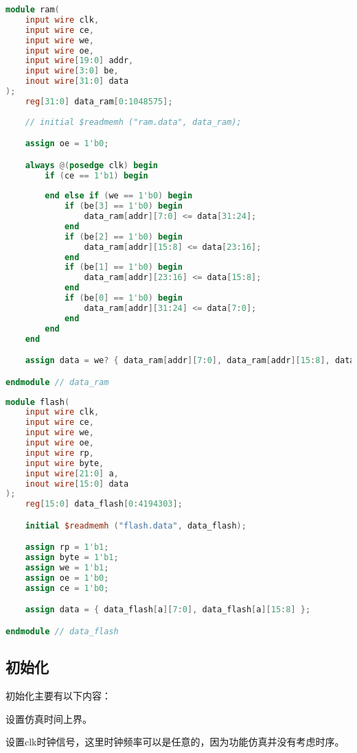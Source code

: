 \begin{lstlisting}[language=verilog]
module ram(
    input wire clk,
    input wire ce,
    input wire we,
    input wire oe,
    input wire[19:0] addr,
    input wire[3:0] be,
    inout wire[31:0] data
);
    reg[31:0] data_ram[0:1048575];
    
    // initial $readmemh ("ram.data", data_ram);

    assign oe = 1'b0;

    always @(posedge clk) begin
        if (ce == 1'b1) begin
            
        end else if (we == 1'b0) begin
            if (be[3] == 1'b0) begin
                data_ram[addr][7:0] <= data[31:24]; 
            end
            if (be[2] == 1'b0) begin
                data_ram[addr][15:8] <= data[23:16]; 
            end
            if (be[1] == 1'b0) begin
                data_ram[addr][23:16] <= data[15:8]; 
            end
            if (be[0] == 1'b0) begin
                data_ram[addr][31:24] <= data[7:0]; 
            end
        end
    end

    assign data = we? { data_ram[addr][7:0], data_ram[addr][15:8], data_ram[addr][23:16], data_ram[addr][31:24] }: 32'bzzzzzzzzzzzzzzzzzzzzzzzzzzzzzzzz;

endmodule // data_ram
\end{lstlisting}

\begin{lstlisting}[language=verilog]
module flash(
    input wire clk,
    input wire ce,
    input wire we,
    input wire oe,
    input wire rp,
    input wire byte,
    input wire[21:0] a,
    inout wire[15:0] data
);
    reg[15:0] data_flash[0:4194303];

    initial $readmemh ("flash.data", data_flash);

    assign rp = 1'b1;
    assign byte = 1'b1;
    assign we = 1'b1;
    assign oe = 1'b0;
    assign ce = 1'b0;

    assign data = { data_flash[a][7:0], data_flash[a][15:8] };

endmodule // data_flash
\end{lstlisting}

\subsection{初始化}

初始化主要有以下内容：

设置仿真时间上界。

设置clk时钟信号，这里时钟频率可以是任意的，因为功能仿真并没有考虑时序。

